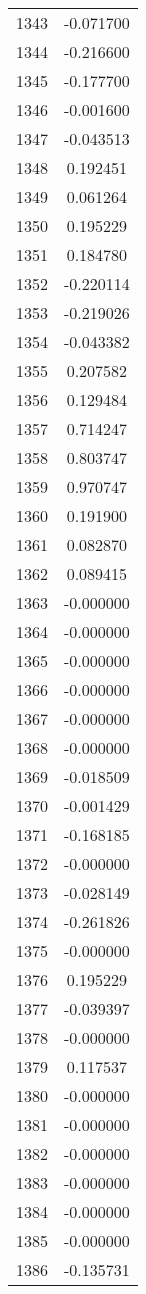 \documentclass[12pt]{article}
\begin{document}
\begin{longtable}{@{}cc@{}}
1343 & -0.071700 \\
1344 & -0.216600 \\
1345 & -0.177700 \\
1346 & -0.001600 \\
1347 & -0.043513 \\
1348 & 0.192451 \\
1349 & 0.061264 \\
1350 & 0.195229 \\
1351 & 0.184780 \\
1352 & -0.220114 \\
1353 & -0.219026 \\
1354 & -0.043382 \\
1355 & 0.207582 \\
1356 & 0.129484 \\
1357 & 0.714247 \\
1358 & 0.803747 \\
1359 & 0.970747 \\
1360 & 0.191900 \\
1361 & 0.082870 \\
1362 & 0.089415 \\
1363 & -0.000000 \\
1364 & -0.000000 \\
1365 & -0.000000 \\
1366 & -0.000000 \\
1367 & -0.000000 \\
1368 & -0.000000 \\
1369 & -0.018509 \\
1370 & -0.001429 \\
1371 & -0.168185 \\
1372 & -0.000000 \\
1373 & -0.028149 \\
1374 & -0.261826 \\
1375 & -0.000000 \\
1376 & 0.195229 \\
1377 & -0.039397 \\
1378 & -0.000000 \\
1379 & 0.117537 \\
1380 & -0.000000 \\
1381 & -0.000000 \\
1382 & -0.000000 \\
1383 & -0.000000 \\
1384 & -0.000000 \\
1385 & -0.000000 \\
1386 & -0.135731 \\

\end{longtable}
\end{document}
